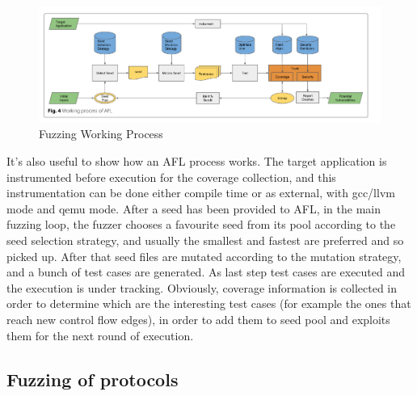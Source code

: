   \begin{figure}[tbh]
    \centering
    \includegraphics[width=1.0\linewidth]{images/intro/fuzz-work.png}
    \caption[Fuzzing Working Process]{Fuzzing Working Process}
    \label{fig:fuzz-work}
  \end{figure}
  


It's also useful to show how an AFL process works.
The target application is instrumented before execution for the coverage collection, and this instrumentation can be done either compile time or as external, with gcc/llvm mode and qemu mode.
After a seed has been provided to AFL, in the main fuzzing loop, the fuzzer chooses a favourite seed from its pool according to the seed selection strategy,
and usually the smallest and fastest are preferred and so picked up. After that seed files are mutated according to the mutation strategy, and a bunch of test cases are generated.
As last step test cases are executed and the execution is under tracking. Obviously, coverage information is collected in order to determine which are the interesting test cases (for example the ones that reach new control flow edges), 
in order to add them to seed pool and exploits them for the next round of execution.



\subsection{Fuzzing of protocols}

